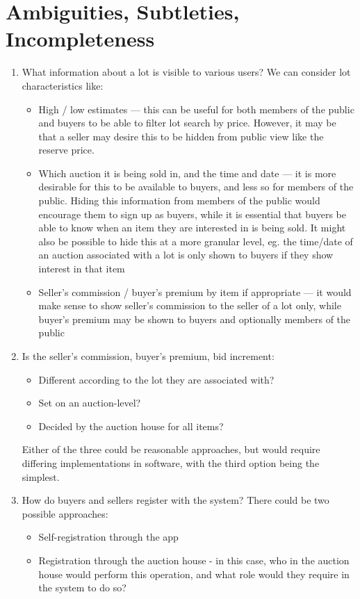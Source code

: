 \documentclass[titlepage, 12pt]{extarticle}
\begin{document}
\section{Ambiguities, Subtleties, Incompleteness}
\begin{enumerate}
\item What information about a lot is visible to various users? We can consider lot characteristics like:
  \begin{itemize}
  \item High / low estimates --- this can be useful for both members of the public and buyers to be able to filter lot search by price. However, it may be that a seller may desire this to be hidden from public view like the reserve price. 
  \item Which auction it is being sold in, and the time and date --- it is more desirable for this to be available to buyers, and less so for members of the public. Hiding this information from members of the public would encourage them to sign up as buyers, while it is essential that buyers be able to know when an item they are interested in is being sold. It might also be possible to hide this at a more granular level, eg. the time/date of an auction associated with a lot is only shown to buyers if they show interest in that item
  \item Seller's commission / buyer's premium by item if appropriate --- it would make sense to show seller's commission to the seller of a lot only, while buyer's premium may be shown to buyers and optionally members of the public
  \end{itemize}
\item Is the seller's commission, buyer's premium, bid increment:
  \begin{itemize}
  \item Different according to the lot they are associated with?
  \item Set on an auction-level?
  \item Decided by the auction house for all items?
  \end{itemize}
  Either of the three could be reasonable approaches, but would require differing implementations in software, with the third option being the simplest.
\item How do buyers and sellers register with the system? There could be two possible approaches:
  \begin{itemize}
  \item Self-registration through the app
  \item Registration through the auction house - in this case, who in the auction house would perform this operation, and what role would they require in the system to do so?

\end{itemize}
\end{enumerate}
\end{document}
